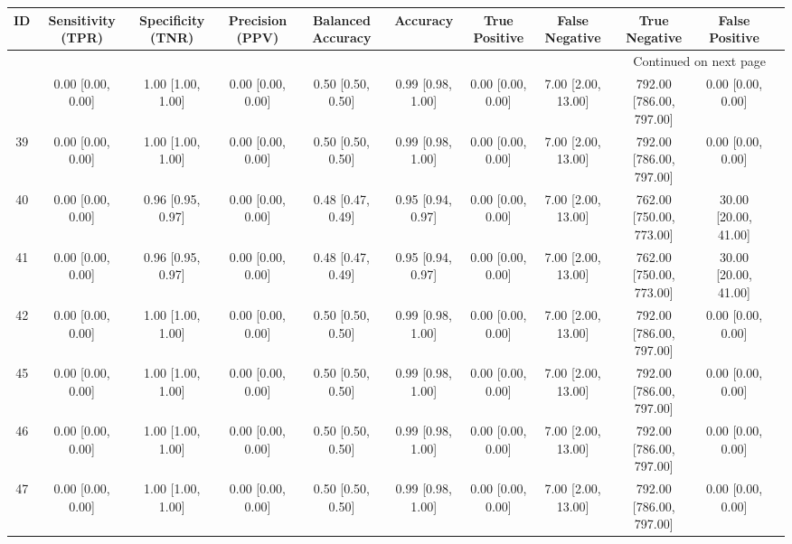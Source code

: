 \documentclass[8pt]{article}
\begin{document}
\begin{center}
\begin{footnotesize}
\begin{longtable}{|ccccccccccc|}
\toprule
 ID &  Sensitivity (TPR) &  Specificity (TNR) &    Precision (PPV) &  Balanced Accuracy &           Accuracy &      True Positive &      False Negative &            True Negative &        False Positive \\
\midrule
\endhead
\midrule
\multicolumn{10}{r}{{Continued on next page}} \\
\midrule
\endfoot

\bottomrule
\endlastfoot
 36 &  0.00 [0.00, 0.00] &  1.00 [1.00, 1.00] &  0.00 [0.00, 0.00] &  0.50 [0.50, 0.50] &  0.99 [0.98, 1.00] &  0.00 [0.00, 0.00] &  7.00 [2.00, 13.00] &  792.00 [786.00, 797.00] &     0.00 [0.00, 0.00] \\
 39 &  0.00 [0.00, 0.00] &  1.00 [1.00, 1.00] &  0.00 [0.00, 0.00] &  0.50 [0.50, 0.50] &  0.99 [0.98, 1.00] &  0.00 [0.00, 0.00] &  7.00 [2.00, 13.00] &  792.00 [786.00, 797.00] &     0.00 [0.00, 0.00] \\
 40 &  0.00 [0.00, 0.00] &  0.96 [0.95, 0.97] &  0.00 [0.00, 0.00] &  0.48 [0.47, 0.49] &  0.95 [0.94, 0.97] &  0.00 [0.00, 0.00] &  7.00 [2.00, 13.00] &  762.00 [750.00, 773.00] &  30.00 [20.00, 41.00] \\
 41 &  0.00 [0.00, 0.00] &  0.96 [0.95, 0.97] &  0.00 [0.00, 0.00] &  0.48 [0.47, 0.49] &  0.95 [0.94, 0.97] &  0.00 [0.00, 0.00] &  7.00 [2.00, 13.00] &  762.00 [750.00, 773.00] &  30.00 [20.00, 41.00] \\
 42 &  0.00 [0.00, 0.00] &  1.00 [1.00, 1.00] &  0.00 [0.00, 0.00] &  0.50 [0.50, 0.50] &  0.99 [0.98, 1.00] &  0.00 [0.00, 0.00] &  7.00 [2.00, 13.00] &  792.00 [786.00, 797.00] &     0.00 [0.00, 0.00] \\
 45 &  0.00 [0.00, 0.00] &  1.00 [1.00, 1.00] &  0.00 [0.00, 0.00] &  0.50 [0.50, 0.50] &  0.99 [0.98, 1.00] &  0.00 [0.00, 0.00] &  7.00 [2.00, 13.00] &  792.00 [786.00, 797.00] &     0.00 [0.00, 0.00] \\
 46 &  0.00 [0.00, 0.00] &  1.00 [1.00, 1.00] &  0.00 [0.00, 0.00] &  0.50 [0.50, 0.50] &  0.99 [0.98, 1.00] &  0.00 [0.00, 0.00] &  7.00 [2.00, 13.00] &  792.00 [786.00, 797.00] &     0.00 [0.00, 0.00] \\
 47 &  0.00 [0.00, 0.00] &  1.00 [1.00, 1.00] &  0.00 [0.00, 0.00] &  0.50 [0.50, 0.50] &  0.99 [0.98, 1.00] &  0.00 [0.00, 0.00] &  7.00 [2.00, 13.00] &  792.00 [786.00, 797.00] &     0.00 [0.00, 0.00] \\

\end{longtable}
\end{footnotesize}
\end{center}
\end{document}
